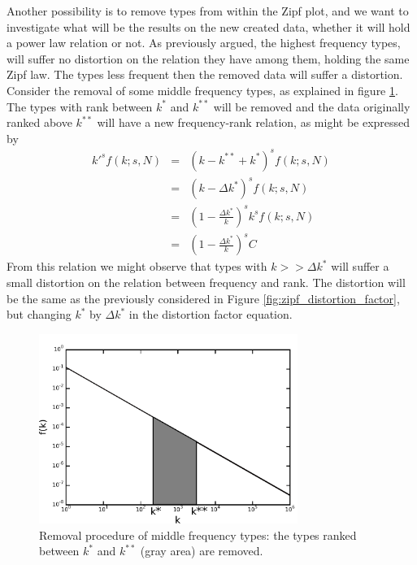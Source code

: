 Another possibility is to remove types from within the Zipf plot, and we want to investigate 
what will be the results on the new created data, whether it will hold a power law relation or not.
As previously argued, the highest frequency types, will suffer no distortion on the relation they
have among them, holding the same Zipf law. The types less frequent then the removed data will suffer
a distortion. Consider the removal of some middle frequency types, as explained in figure
\ref{fig:remove_kast_kastast}. The types with rank between $k^\ast$ and $k^{\ast\ast}$ will be removed
and the data originally ranked above $k^{\ast\ast}$ will have a new frequency-rank relation, as might
be expressed by 
\begin{eqnarray}
k'^s f(k; s, N) &=& (k-k^{\ast\ast}+k^\ast)^s f(k; s, N) \nonumber \\
                &=& (k-\Delta k^\ast)^s f(k; s, N) \nonumber \\
                &=& \left(1 - \frac{\Delta k^\ast}{k} \right)^s k^s f(k; s, N) \nonumber \\
                &=& \left(1 - \frac{\Delta k^\ast}{k} \right)^s C
\end{eqnarray}
From this relation we might observe that types with $k >> \Delta k^\ast$ will suffer a small distortion 
on the relation between frequency and rank. The distortion will be the same as the previously considered
in Figure \ref{fig:zipf_distortion_factor}, but changing $k^\ast$ by $\Delta k^\ast$ in the distortion factor 
equation. 


\begin{figure}[htbp]
\centering
\includegraphics[width=0.75\textwidth]{images/remove_kast_kastast.pdf}
\caption{Removal procedure of middle frequency types: the types ranked between $k^\ast$ and $k^{\ast\ast}$ (gray area) are removed.}
\label{fig:remove_kast_kastast}
\end{figure}



